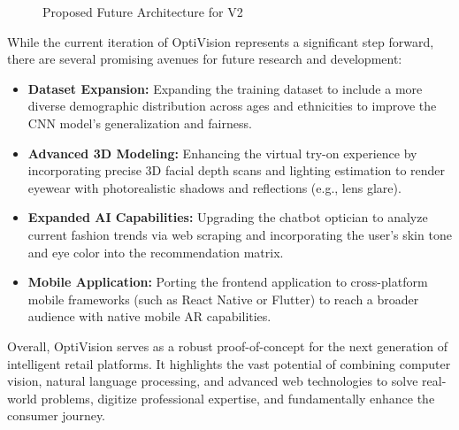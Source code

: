 \begin{figure}[H]
    \centering
    \vspace{8cm}
    \caption{Proposed Future Architecture for V2}
    \label{fig:future_architecture}
\end{figure}

While the current iteration of OptiVision represents a significant step forward, there are several promising avenues for future research and development:
\begin{itemize}
    \item \textbf{Dataset Expansion:} Expanding the training dataset to include a more diverse demographic distribution across ages and ethnicities to improve the CNN model's generalization and fairness.
    \item \textbf{Advanced 3D Modeling:} Enhancing the virtual try-on experience by incorporating precise 3D facial depth scans and lighting estimation to render eyewear with photorealistic shadows and reflections (e.g., lens glare).
    \item \textbf{Expanded AI Capabilities:} Upgrading the chatbot optician to analyze current fashion trends via web scraping and incorporating the user's skin tone and eye color into the recommendation matrix.
    \item \textbf{Mobile Application:} Porting the frontend application to cross-platform mobile frameworks (such as React Native or Flutter) to reach a broader audience with native mobile AR capabilities.
\end{itemize}

Overall, OptiVision serves as a robust proof-of-concept for the next generation of intelligent retail platforms. It highlights the vast potential of combining computer vision, natural language processing, and advanced web technologies to solve real-world problems, digitize professional expertise, and fundamentally enhance the consumer journey.
